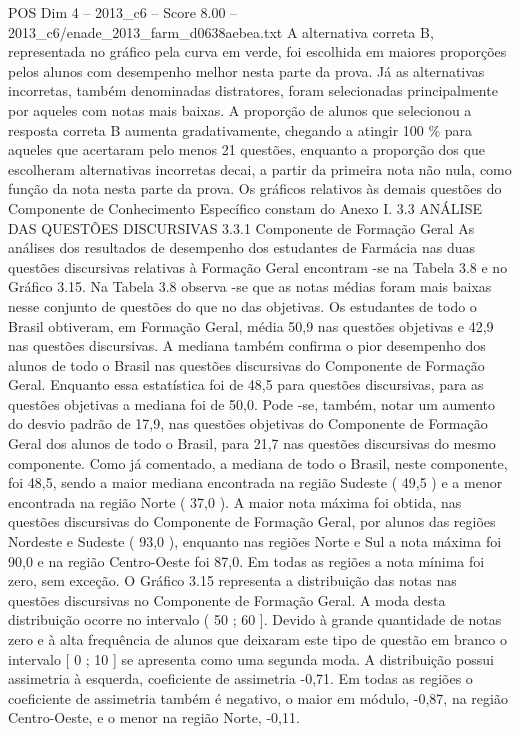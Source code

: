 \begin{textsample}{POS Dim 4 – 2013\_c6 – Score 8.00 – 2013\_c6/enade\_2013\_farm\_d0638aebea.txt}
A alternativa correta B, representada no gráfico pela curva em verde, foi escolhida em maiores proporções pelos alunos com desempenho melhor nesta parte da prova.
Já as alternativas incorretas, também denominadas distratores, foram selecionadas principalmente por aqueles com notas mais baixas.
A proporção de alunos que selecionou a resposta correta B aumenta gradativamente, chegando a atingir 100 \% para aqueles que acertaram pelo menos 21 questões, enquanto a proporção dos que escolheram alternativas incorretas decai, a partir da primeira nota não nula, como função da nota nesta parte da prova.
Os gráficos relativos às demais questões do Componente de Conhecimento Específico constam do Anexo I. 3.3 ANÁLISE DAS QUESTÕES DISCURSIVAS 3.3.1 Componente de Formação Geral As análises dos resultados de desempenho dos estudantes de Farmácia nas duas questões discursivas relativas à Formação Geral encontram -se na Tabela 3.8 e no Gráfico 3.15.
Na Tabela 3.8 observa -se que as notas médias foram mais baixas nesse conjunto de questões do que no das objetivas.
Os estudantes de todo o Brasil obtiveram, em Formação Geral, média 50,9 nas questões objetivas e 42,9 nas questões discursivas.
A mediana também confirma o pior desempenho dos alunos de todo o Brasil nas questões discursivas do Componente de Formação Geral.
Enquanto essa estatística foi de 48,5 para questões discursivas, para as questões objetivas a mediana foi de 50,0.
Pode -se, também, notar um aumento do desvio padrão de 17,9, nas questões objetivas do Componente de Formação Geral dos alunos de todo o Brasil, para 21,7 nas questões discursivas do mesmo componente.
Como já comentado, a mediana de todo o Brasil, neste componente, foi 48,5, sendo a maior mediana encontrada na região Sudeste ( 49,5 ) e a menor encontrada na região Norte ( 37,0 ).
A maior nota máxima foi obtida, nas questões discursivas do Componente de Formação Geral, por alunos das regiões Nordeste e Sudeste ( 93,0 ), enquanto nas regiões Norte e Sul a nota máxima foi 90,0 e na região Centro-Oeste foi 87,0.
Em todas as regiões a nota mínima foi zero, sem exceção.
O Gráfico 3.15 representa a distribuição das notas nas questões discursivas no Componente de Formação Geral.
A moda desta distribuição ocorre no intervalo ( 50 ; 60 ].
Devido à grande quantidade de notas zero e à alta frequência de alunos que deixaram este tipo de questão em branco o intervalo [ 0 ; 10 ] se apresenta como uma segunda moda.
A distribuição possui assimetria à esquerda, coeficiente de assimetria -0,71.
Em todas as regiões o coeficiente de assimetria também é negativo, o maior em módulo, -0,87, na região Centro-Oeste, e o menor na região Norte, -0,11.

\end{textsample}
